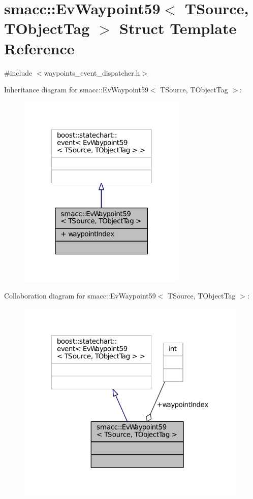 \hypertarget{structsmacc_1_1EvWaypoint59}{}\section{smacc\+:\+:Ev\+Waypoint59$<$ T\+Source, T\+Object\+Tag $>$ Struct Template Reference}
\label{structsmacc_1_1EvWaypoint59}


{\ttfamily \#include $<$waypoints\+\_\+event\+\_\+dispatcher.\+h$>$}



Inheritance diagram for smacc\+:\+:Ev\+Waypoint59$<$ T\+Source, T\+Object\+Tag $>$\+:
\nopagebreak
\begin{figure}[H]
\begin{center}
\leavevmode
\includegraphics[width=227pt]{structsmacc_1_1EvWaypoint59__inherit__graph}
\end{center}
\end{figure}


Collaboration diagram for smacc\+:\+:Ev\+Waypoint59$<$ T\+Source, T\+Object\+Tag $>$\+:
\nopagebreak
\begin{figure}[H]
\begin{center}
\leavevmode
\includegraphics[width=312pt]{structsmacc_1_1EvWaypoint59__coll__graph}
\end{center}
\end{figure}
